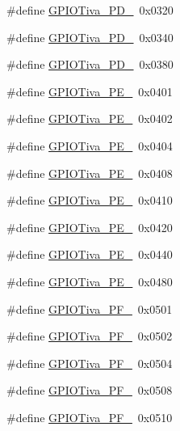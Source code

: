 \begin{DoxyCompactItemize}
\#define \hyperlink{_g_p_i_o_tiva_8h_aa2823fccd2d74cc7ff1f9d698b4e9481}{G\+P\+I\+O\+Tiva\+\_\+\+P\+D\+\_}~0x0320
\item 
\#define \hyperlink{_g_p_i_o_tiva_8h_afaa76d7e461be9ce57fea497fd66c088}{G\+P\+I\+O\+Tiva\+\_\+\+P\+D\+\_}~0x0340
\item 
\#define \hyperlink{_g_p_i_o_tiva_8h_ab40f105cfd8d5c8debd99e82aa8e8e67}{G\+P\+I\+O\+Tiva\+\_\+\+P\+D\+\_}~0x0380
\item 
\#define \hyperlink{_g_p_i_o_tiva_8h_a3e3bdf80feebea157a2d7e6919f7bc0d}{G\+P\+I\+O\+Tiva\+\_\+\+P\+E\+\_}~0x0401
\item 
\#define \hyperlink{_g_p_i_o_tiva_8h_a35e7e892cd0898c2800c893112bf3257}{G\+P\+I\+O\+Tiva\+\_\+\+P\+E\+\_}~0x0402
\item 
\#define \hyperlink{_g_p_i_o_tiva_8h_a417b03b05d2d00612028654d72f0900f}{G\+P\+I\+O\+Tiva\+\_\+\+P\+E\+\_}~0x0404
\item 
\#define \hyperlink{_g_p_i_o_tiva_8h_aac8f95ac9984aa5d1cc782fb63c061e1}{G\+P\+I\+O\+Tiva\+\_\+\+P\+E\+\_}~0x0408
\item 
\#define \hyperlink{_g_p_i_o_tiva_8h_ae9f9a2e9c7a1c09f3fdde26462747ded}{G\+P\+I\+O\+Tiva\+\_\+\+P\+E\+\_}~0x0410
\item 
\#define \hyperlink{_g_p_i_o_tiva_8h_a1bfc870fefa3185e9c8c81b6e7daec36}{G\+P\+I\+O\+Tiva\+\_\+\+P\+E\+\_}~0x0420
\item 
\#define \hyperlink{_g_p_i_o_tiva_8h_ad4e29fb6a063790db7f3f963fa466c87}{G\+P\+I\+O\+Tiva\+\_\+\+P\+E\+\_}~0x0440
\item 
\#define \hyperlink{_g_p_i_o_tiva_8h_acdc88d746f04e4e1150c70b2dec542df}{G\+P\+I\+O\+Tiva\+\_\+\+P\+E\+\_}~0x0480
\item 
\#define \hyperlink{_g_p_i_o_tiva_8h_a5d8a4884e56f715de4637e6d43d5dc25}{G\+P\+I\+O\+Tiva\+\_\+\+P\+F\+\_}~0x0501
\item 
\#define \hyperlink{_g_p_i_o_tiva_8h_a94fb3c7bd4911f1b8874eac11f20f26e}{G\+P\+I\+O\+Tiva\+\_\+\+P\+F\+\_}~0x0502
\item 
\#define \hyperlink{_g_p_i_o_tiva_8h_a7f5ddaa680fb12676d0a3cb949c373d3}{G\+P\+I\+O\+Tiva\+\_\+\+P\+F\+\_}~0x0504
\item 
\#define \hyperlink{_g_p_i_o_tiva_8h_abeea5e264d073cdb7d694b0fef6305ab}{G\+P\+I\+O\+Tiva\+\_\+\+P\+F\+\_}~0x0508
\item 
\#define \hyperlink{_g_p_i_o_tiva_8h_a4bbc43bebbda121a241f576954a1660c}{G\+P\+I\+O\+Tiva\+\_\+\+P\+F\+\_}~0x0510
\item 

\end{DoxyCompactItemize}
